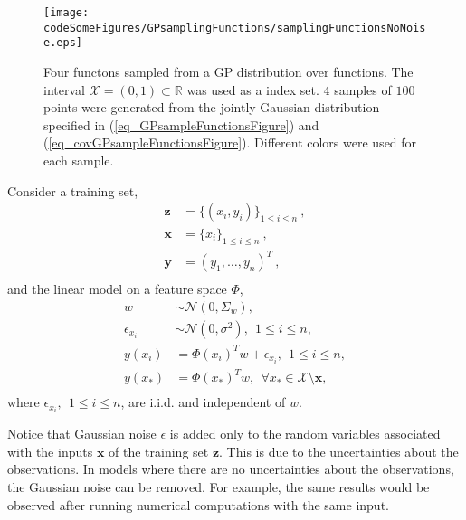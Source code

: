 \begin{figure}[!htbp]
  \centering
    \texttt{[image: codeSomeFigures/GPsamplingFunctions/samplingFunctionsNoNoise.eps]}
  \caption[Functions sampled from a GP]%
{%
Four functons sampled from a GP distribution over functions.
The interval $\mathcal{X} = (0,1) \subset \mathbb{R}$ was used as a index set. $4$ samples of $100$ points were generated from the jointly Gaussian distribution specified in (\ref{eq_GPsampleFunctionsFigure}) and (\ref{eq_covGPsampleFunctionsFigure}). Different colors were used for each sample.}%
  \label{fig_GPsampleFunctions}
\end{figure}

Consider a training set,
$$
 \begin{aligned}
  \pmb{z} &= \{(x_i,y_i)\}_{1 \leq i \leq n} \ , \\
  \pmb{x} &= \{x_i\}_{1 \leq i \leq n} \ , \\
  \pmb{y} &= (y_1, \dots, y_n)^T \ , \\
 \end{aligned}
$$
and the linear model on a feature space $\Phi$,
\begin{equation*}
  \begin{aligned}
    w &\sim \mathcal{N}(0,\Sigma_w), \\ 
    \epsilon_{x_i} &\sim \mathcal{N}(0,\sigma^2), \ \ 1 \leq i \leq n, \\
    y(x_i) &= \Phi(x_i)^Tw + \epsilon_{x_i}, \ \ 1 \leq i \leq n, \\
    y(x_*) &= \Phi(x_*)^Tw, \ \ \forall x_* \in \mathcal{X} \setminus \pmb{x}, \\
  \end{aligned}
\end{equation*}
where $\epsilon_{x_i}, \ \ 1 \leq i \leq n$, are i.i.d. and independent of $w$.

\begin{remark}
  Notice that Gaussian noise $\epsilon$ is added only to the random variables associated with the inputs $\pmb{x}$ of the training set $\pmb{z}$. This is due to the uncertainties about the observations. In models where there are no uncertainties about the observations, the Gaussian noise can be removed. For example, the same results would be observed after running numerical computations with the same input.
\end{remark}

